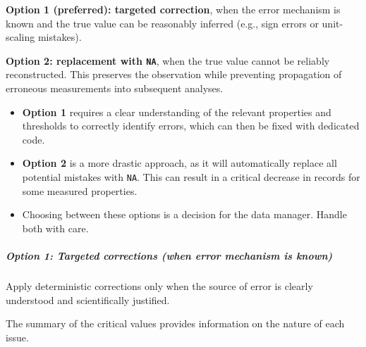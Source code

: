 \documentclass[
  10pt,
  b5paper,
  oneside]{book}
\newenvironment{Shaded}{\begin{snugshade}}{\end{snugshade}}
\newcommand{\ControlFlowTok}[1]{\textcolor[rgb]{0.13,0.29,0.53}{\textbf{#1}}}
\newcommand{\DecValTok}[1]{\textcolor[rgb]{0.00,0.00,0.81}{#1}}
\newcommand{\FunctionTok}[1]{\textcolor[rgb]{0.13,0.29,0.53}{\textbf{#1}}}
\newcommand{\NormalTok}[1]{#1}
\newcommand{\SpecialCharTok}[1]{\textcolor[rgb]{0.81,0.36,0.00}{\textbf{#1}}}
\newcommand{\StringTok}[1]{\textcolor[rgb]{0.31,0.60,0.02}{#1}}
\providecommand{\tightlist}{%
  \setlength{\itemsep}{0pt}\setlength{\parskip}{0pt}}
\begin{document}
\textbf{Option 1 (preferred): targeted correction}, when the error mechanism is known and the true value can be reasonably inferred (e.g., sign errors or unit-scaling mistakes).

\textbf{Option 2: replacement with \texttt{NA}}, when the true value cannot be reliably reconstructed. This preserves the observation while preventing propagation of erroneous measurements into subsequent analyses.

\begin{itemize}
\tightlist
\item
  \textbf{Option 1} requires a clear understanding of the relevant properties and thresholds to correctly identify errors, which can then be fixed with dedicated code.
\item
  \textbf{Option 2} is a more drastic approach, as it will automatically replace all potential mistakes with \texttt{NA}. This can result in a critical decrease in records for some measured properties.
\item
  Choosing between these options is a decision for the data manager. Handle both with care.
\end{itemize}

\subparagraph*{Option 1: Targeted corrections (when error mechanism is known)}\label{option-1-targeted-corrections-when-error-mechanism-is-known}

Apply deterministic corrections only when the source of error is clearly understood and scientifically justified.

The summary of the critical values provides information on the nature of each issue.

\begin{Shaded}
\end{Shaded}
\end{document}
